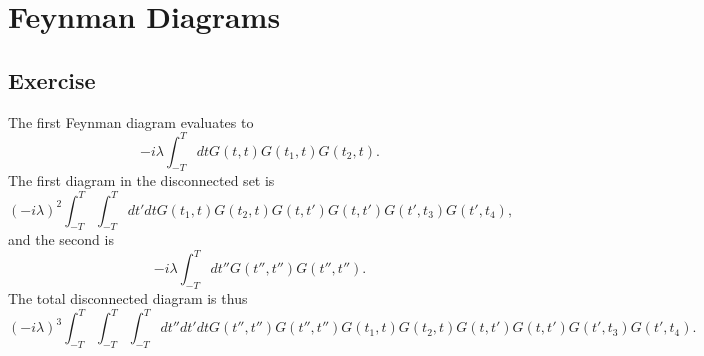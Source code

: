 \section{Feynman Diagrams}

\subsection{Exercise}
The first Feynman diagram evaluates to
\begin{equation}
    -i\lambda \int_{-T}^T dtG(t,t)G(t_1,t)G(t_2,t).
\end{equation}
The first diagram in the disconnected set is
\begin{equation}
    (-i\lambda)^2\int_{-T}^T\int_{-T}^T dt'dtG(t_1,t)G(t_2,t)G(t,t')G(t,t')G(t',t_3)G(t',t_4),
\end{equation}
and the second is
\begin{equation}
    -i\lambda \int_{-T}^T dt'' G(t'',t'')G(t'',t'').
\end{equation}
The total disconnected diagram is thus
\begin{equation}
    (-i\lambda)^3\int_{-T}^T\int_{-T}^T\int_{-T}^T dt''dt'dtG(t'',t'')G(t'',t'')G(t_1,t)G(t_2,t)G(t,t')G(t,t')G(t',t_3)G(t',t_4).
\end{equation}
